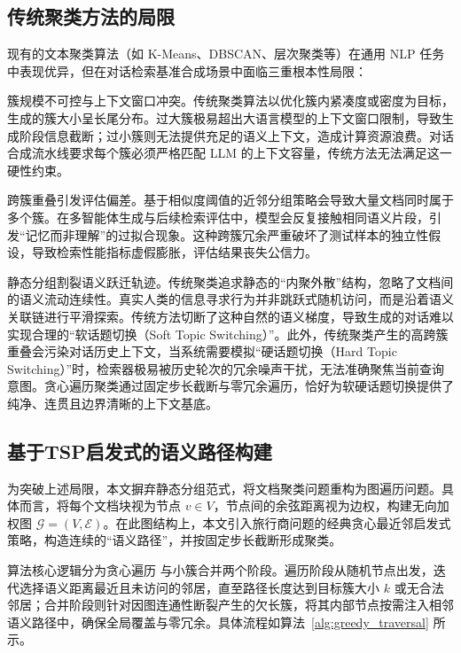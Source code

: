 \subsection{传统聚类方法的局限}



现有的文本聚类算法（如 K-Means、DBSCAN、层次聚类等）在通用 NLP 任务中表现优异，但在对话检索基准合成场景中面临三重根本性局限：



簇规模不可控与上下文窗口冲突。传统聚类算法以优化簇内紧凑度或密度为目标，生成的簇大小呈长尾分布。过大簇极易超出大语言模型的上下文窗口限制，导致生成阶段信息截断；过小簇则无法提供充足的语义上下文，造成计算资源浪费。对话合成流水线要求每个簇必须严格匹配 LLM 的上下文容量，传统方法无法满足这一硬性约束。



跨簇重叠引发评估偏差。基于相似度阈值的近邻分组策略会导致大量文档同时属于多个簇。在多智能体生成与后续检索评估中，模型会反复接触相同语义片段，引发“记忆而非理解”的过拟合现象。这种跨簇冗余严重破坏了测试样本的独立性假设，导致检索性能指标虚假膨胀，评估结果丧失公信力。



静态分组割裂语义跃迁轨迹。传统聚类追求静态的“内聚外散”结构，忽略了文档间的语义流动连续性。真实人类的信息寻求行为并非跳跃式随机访问，而是沿着语义关联链进行平滑探索。传统方法切断了这种自然的语义梯度，导致生成的对话难以实现合理的“软话题切换（Soft Topic Switching）”。此外，传统聚类产生的高跨簇重叠会污染对话历史上下文，当系统需要模拟“硬话题切换（Hard Topic Switching）”时，检索器极易被历史轮次的冗余噪声干扰，无法准确聚焦当前查询意图。贪心遍历聚类通过固定步长截断与零冗余遍历，恰好为软硬话题切换提供了纯净、连贯且边界清晰的上下文基底。



\subsection{基于TSP启发式的语义路径构建}



为突破上述局限，本文摒弃静态分组范式，将文档聚类问题重构为图遍历问题。具体而言，将每个文档块视为节点 $v \in V$，节点间的余弦距离视为边权，构建无向加权图 $\mathcal{G}=(V, \mathcal{E})$。在此图结构上，本文引入旅行商问题的经典贪心最近邻启发式策略，构造连续的“语义路径”，并按固定步长截断形成聚类。



算法核心逻辑分为贪心遍历 与小簇合并两个阶段。遍历阶段从随机节点出发，迭代选择语义距离最近且未访问的邻居，直至路径长度达到目标簇大小 $k$ 或无合法邻居；合并阶段则针对因图连通性断裂产生的欠长簇，将其内部节点按需注入相邻语义路径中，确保全局覆盖与零冗余。具体流程如算法~\ref{alg:greedy_traversal} 所示。



